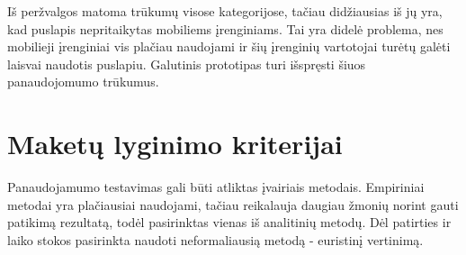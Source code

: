 \documentclass{VUMIFPSkursinis}
\begin{document}
Iš peržvalgos matoma trūkumų visose kategorijose, tačiau didžiausias iš jų yra, kad puslapis nepritaikytas mobiliems įrenginiams. Tai yra didelė problema, nes mobilieji įrenginiai vis plačiau naudojami \cite{EmergingmHealthEn} ir šių įrenginių vartotojai turėtų galėti laisvai naudotis puslapiu. Galutinis prototipas turi išspręsti šiuos panaudojomumo trūkumus.

\section{Maketų lyginimo kriterijai}
Panaudojamumo testavimas gali būti atliktas įvairiais metodais. Empiriniai metodai yra plačiausiai naudojami\cite{NielsenUsabilityEn}, tačiau reikalauja daugiau žmonių norint gauti patikimą rezultatą, todėl pasirinktas vienas iš analitinių metodų. Dėl patirties ir laiko stokos pasirinkta naudoti neformaliausią metodą - euristinį vertinimą.
\end{document}
